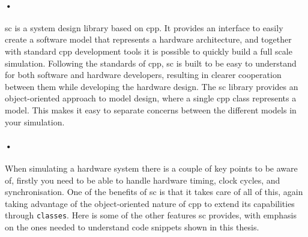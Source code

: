 \documentclass[a4paper, 12pt]{report}
\newcommand{\codeword}[1]{\texttt{#1}}
\begin{document}
\paragraph{•}
\gls{sc} is a system design library based on \gls{cpp}\cite{systemc}.
It provides an interface to easily create a software model that represents a hardware architecture, and together with standard \gls{cpp} development tools it is possible to quickly build a full scale simulation.
Following the standards of \gls{cpp}, \gls{sc} is built to be easy to understand for both software and hardware developers, resulting in clearer cooperation between them while developing the hardware design.
The \gls{sc} library provides an object-oriented approach to model design, where a single \gls{cpp} class represents a model.
This makes it easy to separate concerns between the different models in your simulation.

\paragraph{•}
When simulating a hardware system there is a couple of key points to be aware of, firstly you need to be able to handle hardware timing, clock cycles, and synchronisation.
One of the benefits of \gls{sc} is that it takes care of all of this, again taking advantage of the object-oriented nature of \gls{cpp} to extend its capabilities through \codeword{classes}.
Here is some of the other features \gls{sc} provides, with emphasis on the ones needed to understand code snippets shown in this thesis.
\end{document}
